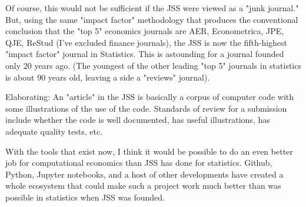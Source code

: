 Of course, this would not be sufficient if the JSS were viewed as a "junk journal." But, using the same "impact factor" methodology that produces the conventional conclusion that the "top 5" economics journals are AER, Econometrica, JPE, QJE, ReStud (I've excluded finance journals), the JSS is now the fifth-highest "impact factor" journal in Statistics. This is astounding for a journal founded only 20 years ago. (The youngest of the other leading "top 5" journals in statistics is about 90 years old, leaving a side a "reviews" journal).

Elaborating: An "article" in the JSS is basically a corpus of computer code with some illustrations of the use of the code. Standards of review for a submission include whether the code is well documented, has useful illustrations, has adequate quality tests, etc.

With the tools that exist now, I think it would be possible to do an even better job for computational economics than JSS has done for statistics. Github, Python, Jupyter notebooks, and a host of other developments have created a whole ecosystem that could make such a project work much better than was possible in statistics when JSS was founded.


